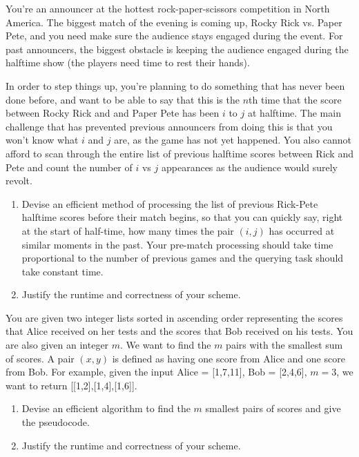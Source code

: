 \documentclass{common/cs157}
\begin{document}
\homeworkhandin

\begin{problem}{1}
You're an announcer at the hottest rock-paper-scissors competition in North America. The biggest match of the evening is coming up, Rocky Rick vs. Paper Pete, and you need make sure the audience stays engaged during the event. For past announcers, the biggest obstacle is keeping the audience engaged during the halftime show (the players need time to rest their hands). 

In order to step things up, you're planning to do something that has never been done before, and want to be able to say that this is the $n$th time that the score between Rocky Rick and and Paper Pete has been $i$ to $j$ at halftime. The main challenge that has prevented previous announcers from doing this is that you won't know what $i$ and $j$ are, as the game has not yet happened. You also cannot afford to scan through the entire list of previous halftime scores between Rick and Pete and count the number of $i$ vs $j$ appearances as the audience would surely revolt.

\begin{enumerate}
    \item Devise an efficient method of processing the list of previous Rick-Pete halftime scores before their match begins, so that you can quickly say, right at the start of half-time, how many times the pair $(i, j)$ has occurred at similar moments in the past. Your pre-match processing should take time proportional to the number of previous games and the querying task should take constant time. 
    \item Justify the runtime and correctness of your scheme.
\end{enumerate}
\end{problem}

\newpage
\begin{problem}{2}
You are given two integer lists sorted in ascending order representing the scores that Alice received on her tests and the scores that Bob received on his tests. You are also given an integer $m$. We want to find the $m$ pairs with the smallest sum of scores. A pair $(x,y)$ is defined as having one score from Alice and one score from Bob. For example, given the input Alice = [1,7,11], Bob = [2,4,6], $m = 3$, we want to return [[1,2],[1,4],[1,6]].

\begin{enumerate}
    \item Devise an efficient algorithm to find the $m$ smallest pairs of scores and give the pseudocode. 
    \item Justify the runtime and correctness of your scheme.
\end{enumerate}
\end{problem}
\end{document}
